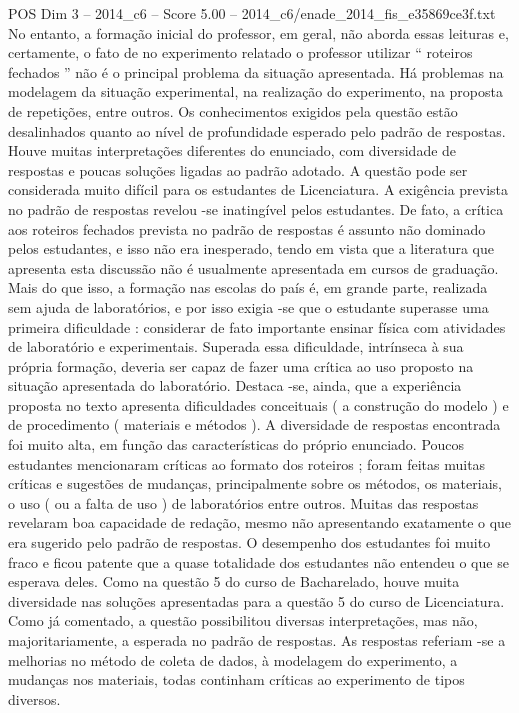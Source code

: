 \begin{textsample}{POS Dim 3 – 2014\_c6 – Score 5.00 – 2014\_c6/enade\_2014\_fis\_e35869ce3f.txt}
No entanto, a formação inicial do professor, em geral, não aborda essas leituras e, certamente, o fato de no experimento relatado o professor utilizar “ roteiros fechados ” não é o principal problema da situação apresentada.
Há problemas na modelagem da situação experimental, na realização do experimento, na proposta de repetições, entre outros.
Os conhecimentos exigidos pela questão estão desalinhados quanto ao nível de profundidade esperado pelo padrão de respostas.
Houve muitas interpretações diferentes do enunciado, com diversidade de respostas e poucas soluções ligadas ao padrão adotado.
A questão pode ser considerada muito difícil para os estudantes de Licenciatura.
A exigência prevista no padrão de respostas revelou -se inatingível pelos estudantes.
De fato, a crítica aos roteiros fechados prevista no padrão de respostas é assunto não dominado pelos estudantes, e isso não era inesperado, tendo em vista que a literatura que apresenta esta discussão não é usualmente apresentada em cursos de graduação.
Mais do que isso, a formação nas escolas do país é, em grande parte, realizada sem ajuda de laboratórios, e por isso exigia -se que o estudante superasse uma primeira dificuldade : considerar de fato importante ensinar física com atividades de laboratório e experimentais.
Superada essa dificuldade, intrínseca à sua própria formação, deveria ser capaz de fazer uma crítica ao uso proposto na situação apresentada do laboratório.
Destaca -se, ainda, que a experiência proposta no texto apresenta dificuldades conceituais ( a construção do modelo ) e de procedimento ( materiais e métodos ).
A diversidade de respostas encontrada foi muito alta, em função das características do próprio enunciado.
Poucos estudantes mencionaram críticas ao formato dos roteiros ; foram feitas muitas críticas e sugestões de mudanças, principalmente sobre os métodos, os materiais, o uso ( ou a falta de uso ) de laboratórios entre outros.
Muitas das respostas revelaram boa capacidade de redação, mesmo não apresentando exatamente o que era sugerido pelo padrão de respostas.
O desempenho dos estudantes foi muito fraco e ficou patente que a quase totalidade dos estudantes não entendeu o que se esperava deles.
Como na questão 5 do curso de Bacharelado, houve muita diversidade nas soluções apresentadas para a questão 5 do curso de Licenciatura.
Como já comentado, a questão possibilitou diversas interpretações, mas não, majoritariamente, a esperada no padrão de respostas.
As respostas referiam -se a melhorias no método de coleta de dados, à modelagem do experimento, a mudanças nos materiais, todas continham críticas ao experimento de tipos diversos.

\end{textsample}
